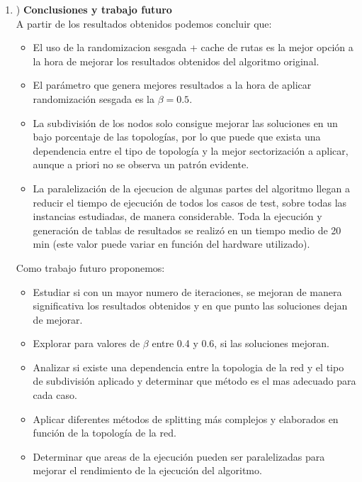 \documentclass[11pt]{article} %
\begin{document}
\begin{enumerate}
   \item) \textbf{Conclusiones y trabajo futuro}\\[0.2cm]

A partir de los resultados obtenidos podemos concluir que:

\begin{itemize}
\item El uso de la randomizacion sesgada + cache de rutas es la mejor opción a la hora de mejorar los resultados obtenidos del algoritmo original.
\item El parámetro que genera mejores resultados a la hora de aplicar randomización sesgada es la $\beta  = 0.5$.
\item La subdivisión de los nodos solo consigue mejorar las soluciones en un bajo porcentaje de las topologías, por lo que puede que exista una dependencia entre el tipo de topología y la mejor sectorización a aplicar, aunque a priori no se observa un patrón evidente.
\item La paralelización de la ejecucion de algunas partes del algoritmo llegan a reducir el tiempo de ejecución de todos los casos de test, sobre todas las instancias estudiadas, de manera considerable. Toda la ejecución y generación de tablas de resultados se realizó en un tiempo medio de 20 min (este valor puede variar en función del hardware utilizado).
\end{itemize}

Como trabajo futuro proponemos: 

\begin{itemize}
\item Estudiar si con un mayor numero de iteraciones, se mejoran de manera significativa los resultados obtenidos y en que punto las soluciones dejan de mejorar.
\item Explorar para valores de $\beta$ entre 0.4 y 0.6, si las soluciones mejoran.
\item Analizar si existe una dependencia entre la topologia de la red y el tipo de subdivisión aplicado y determinar que método es el mas adecuado para cada caso.
\item Aplicar diferentes métodos de splitting más complejos y elaborados en función de la topología de la red.
\item Determinar que areas de la ejecución pueden ser paralelizadas para mejorar el rendimiento de la ejecución del algoritmo.
\end{itemize}

 \end{enumerate}
\end{document}
